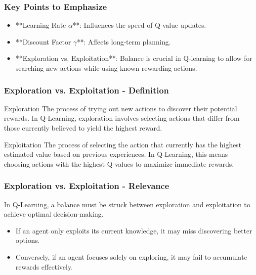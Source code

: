 \documentclass[aspectratio=169]{beamer}
\begin{document}
\begin{frame}[fragile]
    \frametitle{Key Points to Emphasize}
    \begin{itemize}
        \item **Learning Rate \( \alpha \)**: Influences the speed of Q-value updates.
        \item **Discount Factor \( \gamma \)**: Affects long-term planning.
        \item **Exploration vs. Exploitation**: Balance is crucial in Q-learning to allow for searching new actions while using known rewarding actions.
    \end{itemize}
\end{frame}

\begin{frame}[fragile]
    \frametitle{Exploration vs. Exploitation - Definition}
    \begin{block}{Exploration}
        The process of trying out new actions to discover their potential rewards. In Q-Learning, exploration involves selecting actions that differ from those currently believed to yield the highest reward.
    \end{block}
    
    \begin{block}{Exploitation}
        The process of selecting the action that currently has the highest estimated value based on previous experiences. In Q-Learning, this means choosing actions with the highest Q-values to maximize immediate rewards.
    \end{block}
\end{frame}

\begin{frame}[fragile]
    \frametitle{Exploration vs. Exploitation - Relevance}
    In Q-Learning, a balance must be struck between exploration and exploitation to achieve optimal decision-making. 

    \begin{itemize}
        \item If an agent only exploits its current knowledge, it may miss discovering better options.
        \item Conversely, if an agent focuses solely on exploring, it may fail to accumulate rewards effectively.
    \end{itemize}
\end{frame}
\end{document}
